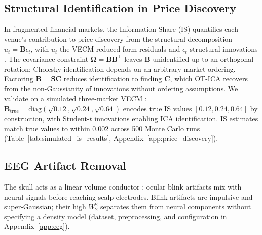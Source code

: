 \documentclass{tpm2026} %
\begin{document}
\subsection{Structural Identification in Price Discovery}
In fragmented financial markets, the Information Share (IS) \citep{hasbrouck1995, baillie2002} quantifies each venue's contribution to price discovery from the structural decomposition $u_t = \mathbf{B}\epsilon_t$, with $u_t$ the VECM reduced-form residuals and $\epsilon_t$ structural innovations \citep{engle1987, johansen1991}. The covariance constraint $\boldsymbol{\Omega} = \mathbf{B}\mathbf{B}^\top$ leaves $\mathbf{B}$ unidentified up to an orthogonal rotation; Cholesky identification depends on an arbitrary market ordering. Factoring $\mathbf{B} = \mathbf{S}\mathbf{C}$ \citep{zema2025} reduces identification to finding $\mathbf{C}$, which OT-ICA recovers from the non-Gaussianity of innovations without ordering assumptions.
We validate on a simulated three-market VECM \citep{zema2025}: $\mathbf{B}_\text{true} = \mathrm{diag}(\sqrt{0.12}, \sqrt{0.24}, \sqrt{0.64})$ encodes true IS values $[0.12, 0.24, 0.64]$ by construction, with Student-$t$ innovations enabling ICA identification.
IS estimates match true values to within $0.002$ across 500 Monte Carlo runs (Table~\ref{tab:simulated_is_results}, Appendix~\ref{app:price_discovery}).

\begin{table}[htbp]
    \centering
    \caption{IS recovery across 500 Monte Carlo runs without imposing Cholesky ordering.}
    \label{tab:simulated_is_results}
\end{table}

\subsection{EEG Artifact Removal}
The skull acts as a linear volume conductor \citep{hyvarinen2001}: ocular blink artifacts mix with neural signals before reaching scalp electrodes. 
Blink artifacts are impulsive and super-Gaussian; their high $W_2^2$ separates them from neural components without specifying a density model (dataset, preprocessing, and configuration in Appendix~\ref{app:eeg}).
\end{document}
